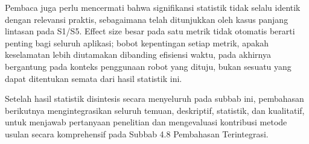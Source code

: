 Pembaca juga perlu mencermati bahwa signifikansi statistik tidak selalu
identik dengan relevansi praktis, sebagaimana telah ditunjukkan oleh kasus
panjang lintasan pada S1/S5. Effect size besar pada satu metrik tidak
otomatis berarti penting bagi seluruh aplikasi; bobot kepentingan setiap
metrik, apakah keselamatan lebih diutamakan dibanding efisiensi waktu,
pada akhirnya bergantung pada konteks penggunaan robot yang dituju, bukan
sesuatu yang dapat ditentukan semata dari hasil statistik ini.

Setelah hasil statistik disintesis secara menyeluruh pada subbab ini,
pembahasan berikutnya mengintegrasikan seluruh temuan, deskriptif,
statistik, dan kualitatif, untuk menjawab pertanyaan penelitian dan
mengevaluasi kontribusi metode usulan secara komprehensif pada
Subbab 4.8 Pembahasan Terintegrasi.